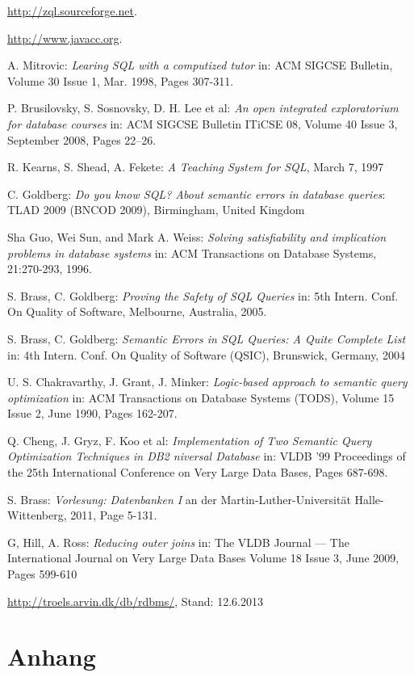 \documentclass[12pt]{scrreprt}
\theoremstyle{remark}
\begin{document}
\begin{thebibliography}{9}
 \url{http://zql.sourceforge.net}.

 \newblock\url{http://www.javacc.org}.

A. Mitrovic: \emph{Learing SQL with a computized tutor} in: ACM SIGCSE Bulletin, Volume 30 		Issue 1, Mar. 1998, Pages 307-311. 

P. Brusilovsky, S. Sosnovsky, D. H. Lee et al: \emph{An open integrated exploratorium for 		database courses} in: ACM SIGCSE Bulletin  ITiCSE 08, Volume 40 Issue 3, September 2008, Pages 22--26.

R. Kearns, S. Shead, A. Fekete: \emph{A Teaching System for SQL}, March 7, 1997 

C. Goldberg: \emph{Do you know SQL? About semantic errors in database queries}: TLAD 2009 (BNCOD 2009), Birmingham, United Kingdom

Sha Guo, Wei Sun, and Mark A. Weiss: \emph{Solving satisfiability and implication problems in database systems} in: ACM Transactions on Database Systems, 21:270-293,
1996.

S. Brass, C. Goldberg: \emph{Proving the Safety of SQL Queries} in: 5th Intern. Conf. On Quality of Software, Melbourne, Australia, 2005.

S. Brass, C. Goldberg: \emph{Semantic Errors in SQL Queries: A Quite Complete List} in: 4th Intern. Conf. On Quality of Software (QSIC), Brunswick, Germany, 2004

U. S. Chakravarthy, J. Grant, J. Minker: \emph{Logic-based approach to semantic query optimization} in: ACM Transactions on Database Systems (TODS), Volume 15 Issue 2, June 1990, Pages 162-207.

Q. Cheng, J. Gryz, F. Koo et al: \emph{Implementation of Two Semantic Query Optimization Techniques in DB2 niversal Database} in: VLDB '99 Proceedings of the 25th International Conference on Very Large Data Bases, Pages 687-698.

S. Brass: \emph{Vorlesung: Datenbanken I} an der Martin-Luther-Universität Halle-Wittenberg, 2011, Page 5-131.

G, Hill, A. Ross: \emph{Reducing outer joins} in: The VLDB Journal — The International Journal on Very Large Data Bases Volume 18 Issue 3, June 2009, Pages 599-610 

 \url{http://troels.arvin.dk/db/rdbms/}, Stand: 12.6.2013


\end{thebibliography}


\chapter{Anhang}




\end{document}
